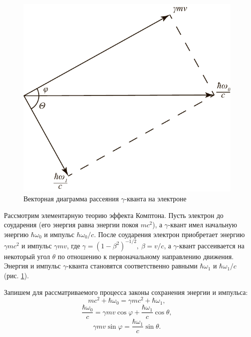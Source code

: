 \documentclass[a4paper, 12pt]{article}
\begin{document}
\begin{figure}
	\begin{center}
		\includegraphics[width=\linewidth]{pic1.pdf}
		\caption{Векторная диаграмма рассеяния $\gamma$-кванта на электроне}
		\label{pic1}
	\end{center}
\end{figure}
Рассмотрим элементарную теорию эффекта Комптона. Пусть электрон до соударения (его энергия равна энергии покоя $mc^2$), а $\gamma$-квант имел начальную энергию $\hbar\omega_0$ и импульс $\hbar\omega_0/c$. После соударения электрон приобретает энергию $\gamma mc^2$ и импульс $\gamma mv$, где $\gamma=(1-\beta^2)^{-1/2},\ \beta=v/c$, а $\gamma$-квант рассеивается на некоторый угол $\theta$ по отношению к первоначальному направлению движения. Энергия и импульс $\gamma$-кванта становятся соответственно равными $\hbar\omega_1$ и $\hbar\omega_1/c$ (рис. \ref{pic1}).\par
Запишем для рассматриваемого процесса законы сохранения энергии и импульса:
\begin{equation*}
	mc^2+\hbar\omega_0=\gamma mc^2+\hbar\omega_1,
\end{equation*}
\begin{equation*}
	\frac{\hbar\omega_0}{c}=\gamma mv\cos\varphi+\frac{\hbar\omega_1}{c}\cos\theta,
\end{equation*}
\begin{equation*}
	\gamma mv\sin\varphi=\frac{\hbar\omega_1}{c}\sin\theta.
\end{equation*}
\end{document}
